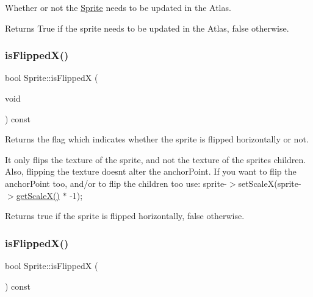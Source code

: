 Whether or not the \hyperlink{classSprite}{Sprite} needs to be updated in the Atlas.

\begin{DoxyReturn}{Returns}
True if the sprite needs to be updated in the Atlas, false otherwise. 
\end{DoxyReturn}
\mbox{\label{classSprite_af16052422347fb5a609f69191e9503e6}} 
\subsubsection{\texorpdfstring{is\+Flipped\+X()}{isFlippedX()}\hspace{0.1cm}{\footnotesize\ttfamily [1/2]}}
{\footnotesize\ttfamily bool Sprite\+::is\+FlippedX (\begin{DoxyParamCaption}\item[{void}]{ }\end{DoxyParamCaption}) const}

Returns the flag which indicates whether the sprite is flipped horizontally or not.

It only flips the texture of the sprite, and not the texture of the sprite\textquotesingle{}s children. Also, flipping the texture doesn\textquotesingle{}t alter the anchor\+Point. If you want to flip the anchor\+Point too, and/or to flip the children too use\+: sprite-\/$>$set\+ScaleX(sprite-\/$>$\hyperlink{classNode_a27040ef8ab59ccf42b87d6ddc8d794e6}{get\+Scale\+X()} $\ast$ -\/1);

\begin{DoxyReturn}{Returns}
true if the sprite is flipped horizontally, false otherwise. 
\end{DoxyReturn}
\mbox{\label{classSprite_af16052422347fb5a609f69191e9503e6}} 
\subsubsection{\texorpdfstring{is\+Flipped\+X()}{isFlippedX()}\hspace{0.1cm}{\footnotesize\ttfamily [2/2]}}
{\footnotesize\ttfamily bool Sprite\+::is\+FlippedX (\begin{DoxyParamCaption}{ }\end{DoxyParamCaption}) const}

